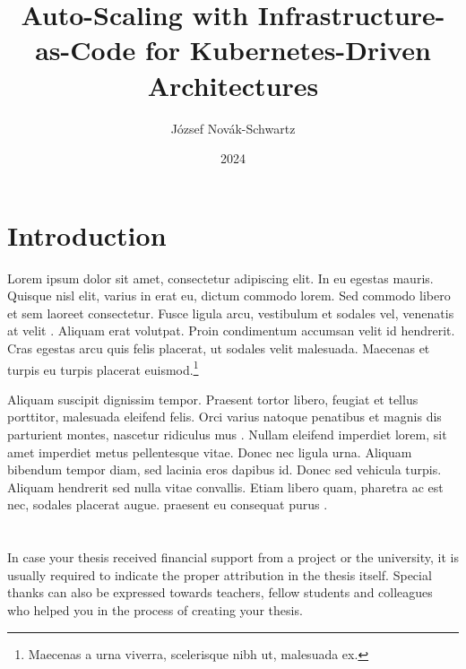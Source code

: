 \documentclass[
]{elteikthesis}[2024/04/10]
\title{Auto-Scaling with Infrastructure-as-Code for Kubernetes-Driven Architectures} %
\date{2024} %
\author{József Novák-Schwartz}
\affiliation{Associate Professor} %
\begin{document}


\maketitle
%

\tableofcontents
\cleardoublepage

\chapter{Introduction}
\label{ch:intro}

Lorem ipsum dolor sit amet, consectetur adipiscing elit. In eu egestas mauris. Quisque nisl elit, varius in erat eu, dictum commodo lorem. Sed commodo libero et sem laoreet consectetur. Fusce ligula arcu, vestibulum et sodales vel, venenatis at velit \cite{dahl1972structured}. Aliquam erat volutpat. Proin condimentum accumsan velit id hendrerit. Cras egestas arcu quis felis placerat, ut sodales velit malesuada. Maecenas et turpis eu turpis placerat euismod.\footnote{Maecenas a urna viverra, scelerisque nibh ut, malesuada ex.}

Aliquam suscipit dignissim tempor. Praesent tortor libero, feugiat et tellus porttitor, malesuada eleifend felis. Orci varius natoque penatibus et magnis dis parturient montes, nascetur ridiculus mus \cite{cormen2009algorithms,krasner1988mvc}. Nullam eleifend imperdiet lorem, sit amet imperdiet metus pellentesque vitae. Donec nec ligula urna. Aliquam bibendum tempor diam, sed lacinia eros dapibus id. Donec sed vehicula turpis. Aliquam hendrerit sed nulla vitae convallis. Etiam libero quam, pharetra ac est nec, sodales placerat augue. \citeauthor{dijkstra1979goto} praesent eu consequat purus \cite{dijkstra1979goto}. 

\cleardoublepage


\cleardoublepage


\cleardoublepage


\cleardoublepage

\chapter*{\acklabel}
In case your thesis received financial support from a project or the university, it is usually required to indicate the proper attribution in the thesis itself. Special thanks can also be expressed towards teachers, fellow students and colleagues who helped you in the process of creating your thesis.
\end{document}
